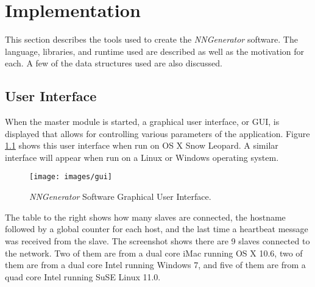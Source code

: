 \chapter[Implementation]{Implementation}
This section describes the tools used to create the {\em NNGenerator} software. 
The language, libraries, and runtime used are described as well as the motivation for each. 
A few of the data structures used are also discussed.



\section{User Interface}
When the master module is started, a graphical user interface, or GUI,
is displayed that allows for controlling various parameters of the
application.
Figure \ref{gui} shows this user interface when run on OS X Snow
Leopard.
A similar interface will appear when run on a Linux or Windows
operating system.

\begin{figure}[htb!]
  \centering
  \texttt{[image: images/gui]}
  \caption{{\it NNGenerator} Software Graphical User Interface.}
  \label{gui}
\end{figure} 

The table to the right shows how many slaves are connected, the
hostname followed by a global counter for each host, and the last time
a heartbeat message was received from the slave.
The screenshot shows there are 9 slaves connected to the network. 
Two of them are from a dual core iMac running OS X 10.6, two of them
are from a dual core Intel running Windows 7, and five of them are
from a quad core Intel running SuSE Linux 11.0.

